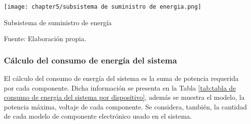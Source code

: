 \begin{myfigure}[H]
	\footnotesize\centering
	\texttt{[image: chapter5/subsistema de suministro de energia.png]}
	\caption{Subsistema de suministro de energía}
	\begin{myflushcenter}
		Fuente: Elaboración propia.
	\end{myflushcenter}
	\label{fig:subsistema de suministro de energia}
\end{myfigure}


\subsubsection{Cálculo del consumo de energía del sistema} 

El cálculo del consumo de energía del sistema es la suma de potencia requerida por cada componente. Dicha información se presenta en la Tabla \ref{tab:tabla de consumo de energia del sistema por dispositivo}, además se muestra el modelo, la potencia máxima, voltaje de cada componente. Se considera, también, la cantidad de cada modelo de componente electrónico usado en el sistema.


